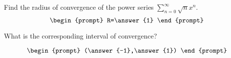 \documentclass{ximera}
\author{Gregory Hartman \and Matthew Carr}
\begin{document}
\begin{exercise}




Find the radius of convergence of the power series $\sum_{n=0}^{\infty}\sqrt{n}x^{n}$.
\[
\begin{prompt}
R=\answer{1}
\end{prompt}
\]

What is the corresponding interval of convergence?

\[
\begin{prompt}
(\answer{-1},\answer{1})
\end{prompt}
\]

\end{exercise}
\end{document}
